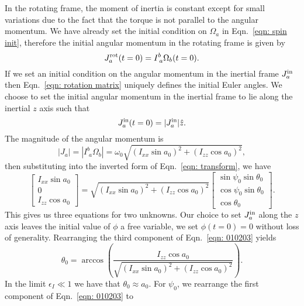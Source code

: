 \documentclass[../full_thesis/full_thesis.tex]{subfiles}
\begin{document}
In the rotating frame, the moment of inertia is constant except for small variations
due to the fact that the torque is not parallel to the angular momentum.
We have already set the initial condition on $\Omega_a$ in Eqn.~\eqref{eqn:
spin init}, therefore the initial angular momentum in the rotating frame is given by
\begin{equation}
  J^{\textrm{rot}}_a(t=0) = I^{b}_{\; a} \Omega_b(t=0).
\end{equation}
If we set an initial condition on the angular momentum in the inertial frame
$J^{\textrm{in}}_a$ then Eqn.~\eqref{eqn: rotation matrix} uniquely defines the initial
Euler angles. We choose to set the initial angular momentum in the inertial
frame to lie along the inertial $z$ axis such that
\begin{equation}
  J^{\textrm{in}}_a(t=0) = |J^{\textrm{in}}_a| \hat{z}.
\end{equation}
The magnitude of the angular momentum is
\begin{equation}
|J_a| = |I^{b}_{\; a} \Omega_{b}|=\omega_{0}\sqrt{(I_{xx}\sin a_{0})^{2} + (I_{zz}\cos a_{0})^{2}},
\end{equation}
then substituting into the inverted form of Eqn.~\eqref{eqn: transform}, we have
\begin{equation}
\left[ \begin{array}{c}
I_{xx}\sin a_{0} \\
0 \\
I_{zz} \cos a_{0}
\end{array}\right] =
\sqrt{(I_{xx}\sin a_{0})^{2} + (I_{zz}\cos a_{0})^{2}}
\left[ \begin{array}{c}
\sin \psi_{0} \sin \theta_{0} \\
\cos \psi_{0} \sin \theta_{0} \\
\cos \theta_{0}
\end{array}\right].
\label{eqn: 010203}
\end{equation}
This gives us three equations for two unknowns. Our choice to set $J^{\textrm{in}}_a$ along
the $z$ axis leaves the initial value of $\phi$ a free variable,
we set $\phi(t=0) = 0$ without loss of generality.
Rearranging the third component of Eqn.~\eqref{eqn: 010203} yields
\begin{equation}
\theta_{0} = \arccos\left(\frac{I_{zz}\cos a_{0}}{ \sqrt{(I_{xx}\sin
        a_{0})^{2} + (I_{zz}\cos a_{0})^{2}}} \right).
\label{eqn: theta init}
\end{equation}
In the limit $\epsilon_{I} \ll 1$ we have that $\theta_{0} \approx a_{0}$.
For $\psi_0$, we rearrange the first component of Eqn.~\eqref{eqn: 010203} to
\end{document}
